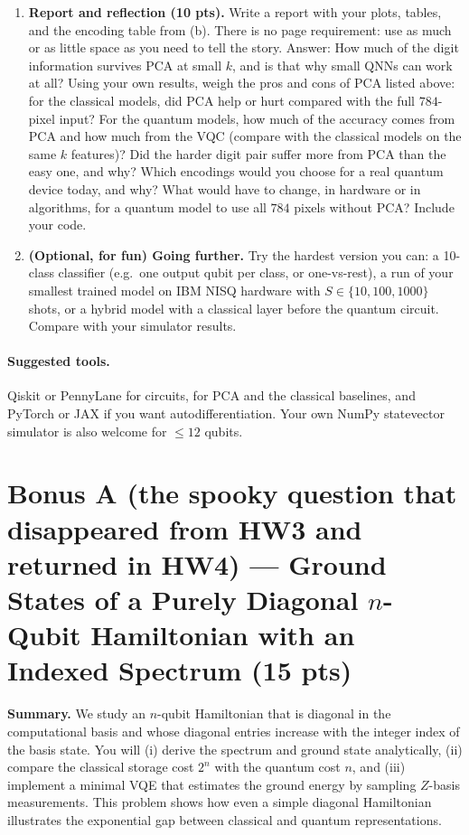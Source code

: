 \documentclass[11pt]{article}
\newenvironment{summary}{\par\noindent\textbf{Summary.} }{\par}
\begin{document}
\begin{enumerate}[label=(\alph*)]
\item \textbf{Report and reflection (10 pts).}
Write a report with your plots, tables, and the encoding table from (b). There is no page requirement: use as much or as little space as you need to tell the story. Answer: How much of the digit information survives PCA at small $k$, and is that why small QNNs can work at all? Using your own results, weigh the pros and cons of PCA listed above: for the classical models, did PCA help or hurt compared with the full $784$-pixel input? For the quantum models, how much of the accuracy comes from PCA and how much from the VQC (compare with the classical models on the same $k$ features)? Did the harder digit pair suffer more from PCA than the easy one, and why? Which encodings would you choose for a real quantum device today, and why? What would have to change, in hardware or in algorithms, for a quantum model to use all $784$ pixels without PCA? Include your code.

\item \textbf{(Optional, for fun) Going further.}
Try the hardest version you can: a 10-class classifier (e.g.\ one output qubit per class, or one-vs-rest), a run of your smallest trained model on IBM NISQ hardware with $S\in\{10,100,1000\}$ shots, or a hybrid model with a classical layer before the quantum circuit. Compare with your simulator results.
\end{enumerate}

\paragraph{Suggested tools.}
Qiskit or PennyLane for circuits,  for PCA and the classical baselines, and PyTorch or JAX if you want autodifferentiation. Your own NumPy statevector simulator is also welcome for $\le 12$ qubits.

\newpage
\section*{Bonus A (the spooky question that disappeared from HW3 and returned in HW4) — Ground States of a Purely Diagonal $n$-Qubit Hamiltonian with an Indexed Spectrum (15 pts)}

\begin{summary}
We study an $n$-qubit Hamiltonian that is diagonal in the computational basis and whose diagonal entries increase with the integer index of the basis state. You will (i) derive the spectrum and ground state analytically, (ii) compare the classical storage cost $2^n$ with the quantum cost $n$, and (iii) implement a minimal VQE that estimates the ground energy by sampling $Z$-basis measurements. This problem shows how even a simple diagonal Hamiltonian illustrates the exponential gap between classical and quantum representations.
\end{summary}
\end{document}
